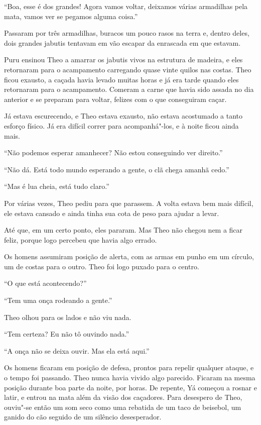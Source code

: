 ``Boa, esse é dos grandes! Agora vamos voltar, deixamos várias
armadilhas pela mata, vamos ver se pegamos alguma coisa.''

Passaram por três armadilhas, buracos um pouco rasos na terra e,
dentro deles, dois grandes jabutis tentavam em vão escapar da enrascada
em que estavam.

Puru ensinou Theo a amarrar os jabutis vivos na estrutura de madeira, e
eles retornaram para o acampamento carregando quase vinte quilos nas
costas. Theo ficou exausto, a caçada havia levado muitas horas e já era
tarde quando eles retornaram para o acampamento. Comeram a carne
que havia sido assada no dia anterior e se preparam para voltar, felizes
com o que conseguiram caçar.

Já estava escurecendo, e Theo estava exausto, não estava acostumado a
tanto esforço físico. Já era difícil correr para acompanhá"-los, e à noite
ficou ainda mais.

``Não podemos esperar amanhecer? Não estou conseguindo ver direito.''

``Não dá. Está todo mundo esperando a gente, o clã chega amanhã cedo.''

``Mas é lua cheia, está tudo claro.''

Por várias vezes, Theo pediu para que parassem. A volta estava bem mais
difícil, ele estava cansado e ainda tinha sua cota de peso para ajudar a
levar.

Até que, em um certo ponto, eles pararam. Mas Theo não chegou nem a ficar feliz,
porque logo percebeu que havia algo errado.

Os homens assumiram posição de alerta, com as armas em punho em um
círculo, um de costas para o outro. Theo foi logo puxado para o centro.

``O que está acontecendo?''

``Tem uma onça rodeando a gente.''

Theo olhou para os lados e não viu nada.

``Tem certeza? Eu não tô ouvindo nada.''

``A onça não se deixa ouvir. Mas ela está aqui.''

Os homens ficaram em posição de defesa, prontos para repelir qualquer
ataque, e o tempo foi passando. Theo nunca havia vivido algo parecido.
Ficaram na mesma posição durante boa parte da noite, por horas. De
repente, Yá começou a rosnar e latir, e entrou na mata além da visão dos
caçadores. Para desespero de Theo, ouviu"-se então um som seco como uma
rebatida de um taco de beisebol, um ganido do cão seguido de um silêncio
desesperador.

